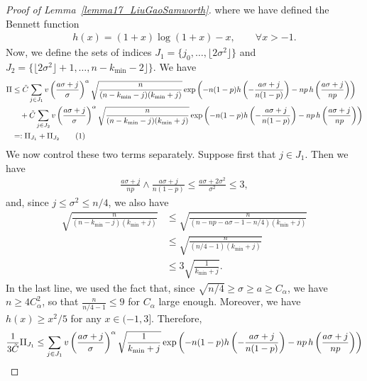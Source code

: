 \documentclass{article}
\newcommand\numberthis{\addtocounter{equation}{1}\tag{\theequation}}
\begin{document}
\begin{proof}[Proof of Lemma~\ref{lemma17_LiuGaoSamworth}]
where we have defined the Bennett function
\begin{align*}
h(x) = (1+x) \log\left(1+x\right) - x, \qquad \forall x > -1.
\end{align*}
Now, we define the sets of indices $J_1 = \{j_0, \dots, \lfloor 2 \sigma^2\rfloor\}$ and $J_2 = \{\lfloor 2 \sigma^2 \rfloor + 1, \dots, n - k_{\min} - 2\rfloor\}$.
We have 
\begin{align*}
    \text{II} & \leq \tilde C\sum_{j\in J_1} v\left(\frac{a\sigma + j}{\sigma}\right)^\alpha \sqrt{\frac{n}{(n-k_{\min}-j)(k_{\min} + j)}} \exp\left(-n(1-p) h\left(-\frac{a\sigma + j}{n(1-p)}\right) - np \, h\left(\frac{a\sigma + j}{np}\right)\right)\\
    & \quad + \tilde C\sum_{j\in J_2} v\left(\frac{a\sigma + j}{\sigma}\right)^\alpha \sqrt{\frac{n}{(n-k_{\min}-j)(k_{\min} + j)}} \exp\left(-n(1-p) h\left(-\frac{a\sigma + j}{n(1-p)}\right) - np \, h\left(\frac{a\sigma + j}{np}\right)\right)\\
    & =: \text{I\hspace{.2mm}I}_{J_1} + \text{I\hspace{.2mm}I}_{J_2}\numberthis \label{eq_split_term_II}
\end{align*}
We now control these two terms separately. 
Suppose first that $j \in J_1$. Then we have 
\begin{align*}
\frac{a\sigma+j}{np} \land \frac{a\sigma+j}{n(1-p)} \leq \frac{a\sigma + 2\sigma^2}{\sigma^2} \leq 3,
\end{align*}
and, since $j \leq \sigma^2 \leq n/4$, we also have
\begin{align*}
    \sqrt{\frac{n}{(n-k_{\min}-j)(k_{\min} + j)}} &\leq \sqrt{\frac{n}{(n-np - a\sigma - 1-n/4)(k_{\min} + j)}}\\
    & \leq \sqrt{\frac{n}{(n/4-1)(k_{\min} + j)}}\\
    & \leq 3 \sqrt{\frac{1}{k_{\min}+j}}.
\end{align*}
In the last line, we used the fact that, since $\sqrt{n/4} \geq \sigma \geq a \geq C_\alpha$, we have $n\geq 4C_\alpha^2$, so that $\frac{n}{n/4-1} \leq 9$ for $C_\alpha$ large enough.
Moreover, we have $h(x) \geq x^2/5$ for any $x \in (-1,3]$. Therefore,
\begin{align*}
\frac{1}{3\tilde C}\text{I\hspace{.2mm}I}_{J_1} &\leq\sum_{j\in J_1}v\left(\frac{a\sigma + j}{\sigma}\right)^\alpha \sqrt{\frac{1}{k_{\min} + j}} \exp\left(-n(1-p) h\left(-\frac{a\sigma + j}{n(1-p)}\right) - np \, h\left(\frac{a\sigma + j}{np}\right)\right)\\

\end{align*}
\end{proof}
\end{document}
